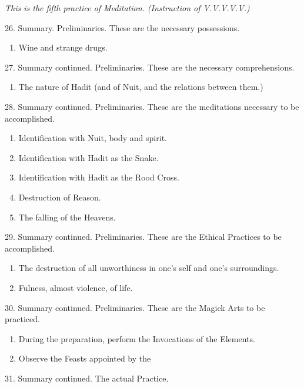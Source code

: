 \textit{This is the fifth practice of Meditation. (Instruction of V.V.V.V.V.)}

26. Summary. Preliminaries. These are the necessary possessions.
\begin{enumerate}[leftmargin=4\parindent]
\item Wine and strange drugs.
\end{enumerate}

27. Summary continued. Preliminaries. These are the necessary comprehensions.

\begin{enumerate}[leftmargin=4\parindent]
\item The nature of Hadit (and of Nuit, and the relations between them.)
\end{enumerate}

28. Summary continued. Preliminaries. These are the meditations necessary to be accomplished.

\begin{enumerate}[leftmargin=4\parindent]

\item Identification with Nuit, body and spirit.
\item Identification with Hadit as the Snake.
\item Identification with Hadit as the Rood Cross.
\item Destruction of Reason.
\item The falling of the Heavens.
\end{enumerate}

29. Summary continued. Preliminaries. These are the Ethical Practices to be accomplished.
\begin{enumerate}[leftmargin=4\parindent]
\item The destruction of all unworthiness in one's self and one's surroundings.
\item Fulness, almost violence, of life.
\end{enumerate}

30. Summary continued. Preliminaries. These are the Magick Arts to be practiced.
\begin{enumerate}[leftmargin=4\parindent]
\item During the preparation, perform the Invocations of the Elements.
\item Observe the Feasts appointed by the \Argentium{}
\end{enumerate}

31. Summary continued. The actual Practice.

